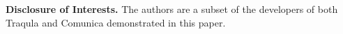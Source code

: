 \documentclass[runningheads]{llncs}
\begin{document}
    \textbf{Disclosure of Interests.} The authors are a subset of the
    developers of both Traqula and Comunica demonstrated in this paper.

%
%
%
    
    
\end{document}
